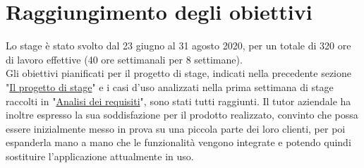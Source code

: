 \section{Raggiungimento degli obiettivi}
\label{sec:raggiungimento-obiettivi}

Lo stage è stato svolto dal 23 giugno al 31 agosto 2020, per un totale di 320 ore di lavoro effettive (40 ore settimanali per 8 settimane).\\
Gli obiettivi pianificati per il progetto di stage, indicati nella precedente sezione "\hyperref[sec:progetto-stage]{Il progetto di stage}" e i casi d'uso analizzati nella prima settimana di stage raccolti in "\hyperref[cap:analisi-dei-requisiti]{Analisi dei requisiti}", sono stati tutti raggiunti.
Il tutor aziendale \myTutor{} ha inoltre espresso la sua soddisfazione per il prodotto realizzato, convinto che possa essere inizialmente messo in prova su una piccola parte dei loro clienti, per poi espanderla mano a mano che le funzionalità vengono integrate e potendo quindi sostituire l'applicazione attualmente in uso.\\